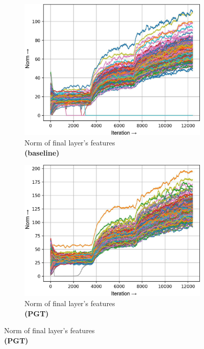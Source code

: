 \documentclass[runningheads]{llncs}
\begin{document}
\begin{figure}[t]
\begin{subfigure}[t]{0.16\textwidth}
\includegraphics[width=\textwidth]{trimmed/baseline-f-layer-22-1}
\caption{Norm of final layer's features\\ \textbf{(baseline)}
}\end{subfigure}
\begin{subfigure}[t]{0.16\textwidth}
\includegraphics[width=\textwidth]{trimmed/pgt-f-layer-22-1}
\caption{Norm of final layer's features\\ \textbf{(PGT)}
}\end{subfigure}

\vspace{6pt}


\end{figure}
\end{document}
